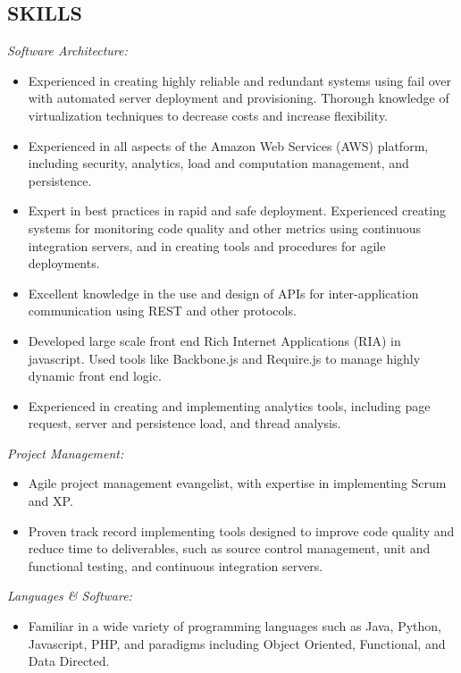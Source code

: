 \documentclass[line,margin]{res}
\begin{document}
\begin{resume}
\section{SKILLS} 
      {\sl Software Architecture:}
    \vspace{-5mm}
	\begin{itemize}
        \item Experienced in creating highly reliable and redundant systems using fail over 
        with automated server deployment and provisioning. Thorough knowledge of virtualization
        techniques to decrease costs and increase flexibility.
        \item Experienced in all aspects of the Amazon Web Services (AWS) platform, including security, analytics, 
        load and computation management, and persistence.
		\item Expert in best practices in rapid and safe deployment. Experienced creating systems
        for monitoring code quality and other metrics using continuous integration servers, and in 
        creating tools and procedures for agile deployments. 
        \item Excellent knowledge in the use and design of APIs for inter-application communication using
        REST and other protocols.
        \item Developed large scale front end Rich Internet Applications (RIA) in javascript. Used tools like Backbone.js and
        Require.js to manage highly dynamic front end logic.
        \item Experienced in creating and implementing analytics tools, including page request, server and persistence load, and thread analysis.
	\end{itemize}
      {\sl Project Management:}
    \vspace{-5mm}
	\begin{itemize}
		\item Agile project management evangelist, with expertise in implementing Scrum and XP.
		\item Proven track record implementing tools designed to improve code
        quality and reduce time to deliverables, such as source control
        management, unit and functional testing, and continuous integration
        servers.        
	\end{itemize}
      {\sl Languages \& Software:} 
    \vspace{-5mm}
	\begin{itemize}
		\item Familiar in a wide variety of programming languages such as Java, Python, Javascript, PHP, and paradigms including Object Oriented, Functional, and Data Directed. 

\end{itemize}
\end{resume}
\end{document}
